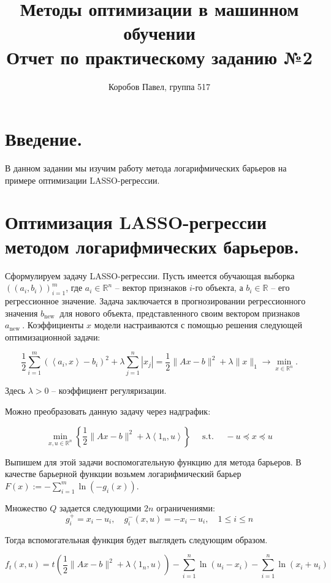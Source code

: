 \documentclass[11pt]{article}
\title{Методы оптимизации в машинном обучении \\
Отчет по практическому заданию №2}
\author{Коробов Павел, группа 517}
\begin{document}
\maketitle
\thispagestyle{empty}

\section{Введение.}
В данном задании мы изучим работу метода логарифмических барьеров на примере оптимизации LASSO-регрессии. 

\section{Оптимизация LASSO-регрессии методом логарифмических барьеров.}
Сформулируем задачу LASSO-регрессии. 
Пусть имеется обучающая выборка $\left(\left(a_{i}, b_{i}\right)\right)_{i=1}^{m}$, где $a_{i} \in \mathbb{R}^{n}$ -- вектор признаков $i$-го объекта, а $b_{i} \in \mathbb{R}$ -- его регрессионное значение.
Задача заключается в прогнозировании регрессионного значения $b_{\text {new }}$ для нового объекта, представленного своим вектором признаков $a_{\text {new }}$.
Коэффициенты $x$ модели настраиваются с помощью решения следующей оптимизационной задачи:

$$\frac{1}{2} \sum_{i=1}^{m}\left(\left\langle a_{i}, x\right\rangle-b_{i}\right)^{2}+\lambda \sum_{j=1}^{n}\left|x_{j}\right|= \frac{1}{2}\|A x-b\|^{2}+\lambda\|x\|_{1} \rightarrow \min _{x \in \mathbb{R}^{n}}.$$

Здесь $\lambda > 0$ -- коэффициент регуляризации.

Можно преобразовать данную задачу через надграфик:

$$\min _{x, u \in \mathbb{R}^{n}}\left\{\frac{1}{2}\|A x-b\|^{2}+\lambda\left\langle 1_{n}, u\right\rangle\right\} \quad \text { s.t. } \quad-u \preceq x \preceq u$$

Выпишем для этой задачи воспомогательную функцию для метода барьеров. В качестве барьерной функции возьмем логарифмический барьер $F(x):=-\sum_{i=1}^{m} \ln \left(-g_{i}(x)\right)$.

Множество $Q$ задается следующими $2n$ ограничениями:
	$$g_i^+ = x_i - u_i, \quad g_i^-(x, u) = -x_i - u_i, \quad 1 \leq i \leq n$$

Тогда вспомогательная функция будет выглядеть следующим образом.

$$f_{t}(x, u) = t \left( \frac{1}{2} \|A x-b\|^{2}+\lambda\left\langle 1_{n}, u\right\rangle \right) - \sum_{i=1}^{n} \ln \left(u_i - x_i\right) - \sum_{i=1}^{n} \ln \left(x_i + u_i\right)$$
\end{document}
